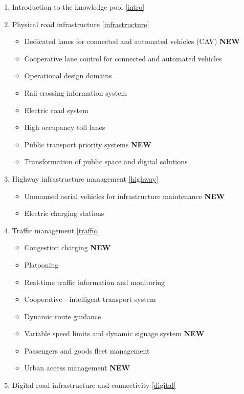 \documentclass[
]{book}
\providecommand{\tightlist}{%
  \setlength{\itemsep}{0pt}\setlength{\parskip}{0pt}}
\begin{document}
\begin{enumerate}
\def\labelenumi{\arabic{enumi}.}
\tightlist
\item
  Introduction to the knowledge pool \ref{intro}
\item
  Physical road infrastructure \ref{infrastructure}

  \begin{itemize}
  \tightlist
  \item
    Dedicated lanes for connected and automated vehicles (CAV) \textbf{NEW}
  \item
    Cooperative lane control for connected and automated vehicles
  \item
    Operational design domains
  \item
    Rail crossing information system
  \item
    Electric road system
  \item
    High occupancy toll lanes
  \item
    Public transport priority systems \textbf{NEW}
  \item
    Transformation of public space and digital solutions
  \end{itemize}
\item
  Highway infrastructure management \ref{highway}

  \begin{itemize}
  \tightlist
  \item
    Unmanned aerial vehicles for infrastructure maintenance \textbf{NEW}
  \item
    Electric charging stations
  \end{itemize}
\item
  Traffic management \ref{traffic}

  \begin{itemize}
  \tightlist
  \item
    Congestion charging \textbf{NEW}
  \item
    Platooning
  \item
    Real-time traffic information and monitoring
  \item
    Cooperative - intelligent transport system
  \item
    Dynamic route guidance
  \item
    Variable speed limits and dynamic signage system \textbf{NEW}
  \item
    Passengers and goods fleet management
  \item
    Urban access management \textbf{NEW}
  \end{itemize}
\item
  Digital road infrastructure and connectivity \ref{digital}


\end{enumerate}
\end{document}
